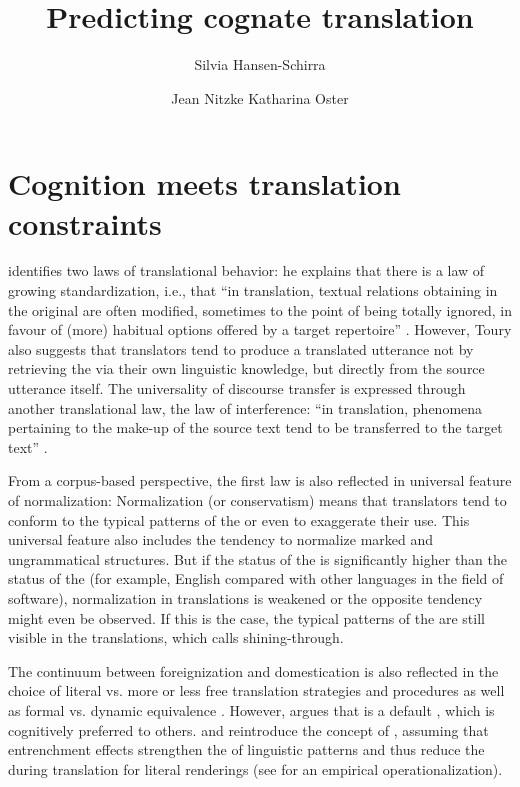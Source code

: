 \documentclass[output=paper]{LSP/langsci}
\title{Predicting cognate translation}
\author{Silvia Hansen-Schirra\and 
Jean Nitzke\lastand
Katharina Oster\affiliation{FTSK Germersheim, Johannes-Gutenberg-Universtität Mainz}}
\begin{document}
\section{Cognition meets translation constraints}\label{hansenschirraetal:sec:1}
\citet{Toury1995} identifies two laws of translational behavior: he explains that there is a law of growing standardization, i.e., that ``in translation, textual relations obtaining in the original are often modified, sometimes to the point of being totally ignored, in favour of (more) habitual options offered by a target repertoire” \citep[268]{Toury1995}. However, Toury also suggests that translators tend to produce a translated utterance not by retrieving the  via their own linguistic knowledge, but directly from the source utterance itself. The universality of discourse transfer is expressed through another translational law, the law of interference: ``in translation, phenomena pertaining to the make-up of the source text tend to be transferred to the target text'' \citep[275]{Toury1995}.
 
From a corpus-based perspective, the first law is also reflected in \citet{Baker1996} universal feature of normalization: Normalization (or conservatism) means that translators tend to conform to the typical patterns of the  or even to exaggerate their use. This universal feature also includes the tendency to normalize marked and ungrammatical structures. But if the status of the  is significantly higher than the status of the  (for example, English compared with other languages in the field of software), normalization in translations is weakened or the opposite tendency might even be observed. If this is the case, the typical patterns of the  are still visible in the translations, which \citet{Teich2003} calls shining-through.

The continuum between foreignization and domestication is also reflected in the choice of literal vs. more or less free translation strategies and procedures as well as formal vs. dynamic equivalence \citep{VinayDarbelnet1995, Newmark1988}. However, \citet{TirkonnenCondit2005} argues that  is a default , which is cognitively preferred to others. \citet{Chesterman2011} and \citet{Halverson2015} reintroduce the concept of , assuming that entrenchment effects strengthen the  of linguistic patterns and thus reduce the  during translation for literal renderings (see \citet{SchaefferCarl2014} for an empirical operationalization).
\end{document}
